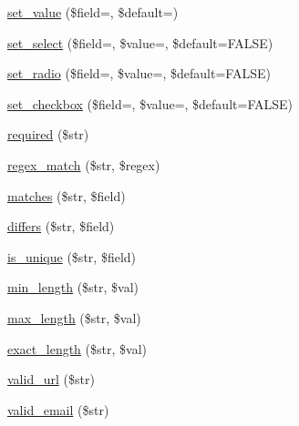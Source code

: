 \begin{DoxyCompactItemize}
\item 
\mbox{\hyperlink{class_c_i___form__validation_af9a77be3fc2da5df878efad37d1c0fe8}{set\+\_\+value}} (\$field=\textquotesingle{}\textquotesingle{}, \$default=\textquotesingle{}\textquotesingle{})
\item 
\mbox{\hyperlink{class_c_i___form__validation_afbd59dc11005e77b4519cca4033a7abd}{set\+\_\+select}} (\$field=\textquotesingle{}\textquotesingle{}, \$value=\textquotesingle{}\textquotesingle{}, \$default=F\+A\+L\+SE)
\item 
\mbox{\hyperlink{class_c_i___form__validation_a9e66e3cdc5ceb81c054d48e1203613f2}{set\+\_\+radio}} (\$field=\textquotesingle{}\textquotesingle{}, \$value=\textquotesingle{}\textquotesingle{}, \$default=F\+A\+L\+SE)
\item 
\mbox{\hyperlink{class_c_i___form__validation_a9b8766fbc61e15894d8d036552503228}{set\+\_\+checkbox}} (\$field=\textquotesingle{}\textquotesingle{}, \$value=\textquotesingle{}\textquotesingle{}, \$default=F\+A\+L\+SE)
\item 
\mbox{\hyperlink{class_c_i___form__validation_ada72eadfd041118d5f429a93dd0de07e}{required}} (\$str)
\item 
\mbox{\hyperlink{class_c_i___form__validation_acef19e29276dbdd2c69dffd5ec635600}{regex\+\_\+match}} (\$str, \$regex)
\item 
\mbox{\hyperlink{class_c_i___form__validation_aefdd25116835b684a2ab9ce6ef58d38c}{matches}} (\$str, \$field)
\item 
\mbox{\hyperlink{class_c_i___form__validation_aff14b601a3e51ef2323a4c241d81267e}{differs}} (\$str, \$field)
\item 
\mbox{\hyperlink{class_c_i___form__validation_a1a5ee6b60f419248ca8796444aea3a78}{is\+\_\+unique}} (\$str, \$field)
\item 
\mbox{\hyperlink{class_c_i___form__validation_a63a166f35fed88ec433fd2a37ec5ae90}{min\+\_\+length}} (\$str, \$val)
\item 
\mbox{\hyperlink{class_c_i___form__validation_a0896e538dd761148e6b3dfb0e033d344}{max\+\_\+length}} (\$str, \$val)
\item 
\mbox{\hyperlink{class_c_i___form__validation_a126edde2bb0ce82d7a202e340a61de9e}{exact\+\_\+length}} (\$str, \$val)
\item 
\mbox{\hyperlink{class_c_i___form__validation_a2879cd05a763105684cbad690e5cffd3}{valid\+\_\+url}} (\$str)
\item 
\mbox{\hyperlink{class_c_i___form__validation_af7d43edae9c6e388390176b3c62de140}{valid\+\_\+email}} (\$str)

\end{DoxyCompactItemize}
